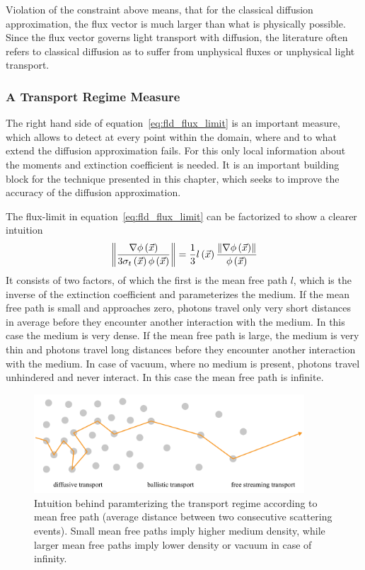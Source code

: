 Violation of the constraint above means, that for the classical diffusion approximation, the flux vector is much larger than what is physically possible. Since the flux vector governs light transport with diffusion, the literature often refers to classical diffusion as to suffer from unphysical fluxes or unphysical light transport.


\subsubsection*{A Transport Regime Measure}

The right hand side of equation~\ref{eq:fld_flux_limit} is an important measure, which allows to detect at every point within the domain, where and to what extend the diffusion approximation fails. For this only local information about the moments and extinction coefficient is needed. It is an important building block for the technique presented in this chapter, which seeks to improve the accuracy of the diffusion approximation.

The flux-limit in equation~\ref{eq:fld_flux_limit} can be factorized to show a clearer intuition
\begin{align}
\label{eq:flux_limit_factors}
\left\lVert
\frac{\nabla\phi\left(\vec{x}\right)}{3\sigma_t\left(\vec{x}\right)\phi\left(\vec{x}\right)}
\right\rVert
=
\frac{1}{3}
l\left(\vec{x}\right)
\frac{\left\lVert\nabla\phi\left(\vec{x}\right)\right\rVert}{\phi\left(\vec{x}\right)}
\end{align}
It consists of two factors, of which the first is the mean free path $l$, which is the inverse of the extinction coefficient and parameterizes the medium. If the mean free path is small and approaches zero, photons travel only very short distances in average before they encounter another interaction with the medium. In this case the medium is very dense. If the mean free path is large, the medium is very thin and photons travel long distances before they encounter another interaction with the medium. In case of vacuum, where no medium is present, photons travel unhindered and never interact. In this case the mean free path is infinite.
\begin{figure}[h]
\centering
\includegraphics[width=0.9\textwidth]{06_fld/figures/fig_transport_regimes_mfp.pdf}
\caption{Intuition behind paramterizing the transport regime according to mean free path (average distance between two consecutive scattering events). Small mean free paths imply higher medium density, while larger mean free paths imply lower density or vacuum in case of infinity.}
\label{fig:fld_transport_regimes_mfp}
\end{figure}



